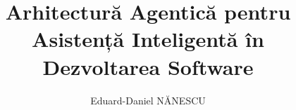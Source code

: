 \documentclass[12pt, a4paper, oneside, romanian]{teza-upb}
\begin{document}
\author{Eduard-Daniel NĂNESCU}
\title{Arhitectură Agentică pentru Asistență Inteligentă în Dezvoltarea Software}

\makeatletter

\renewcommand{\projectdescription} {

  \newpage
  \thispagestyle{empty}
  \small

  \noindent

  \begin{minipage}[t]{0.75\textwidth}
    Universitatea Națională de Știință și Tehnologie POLITEHNICA București\\
    Facultatea de Electronică, Telecomunicații și Tehnologia Informației\\
    Program de studiu \textbf{INF}
  \end{minipage}%

  \begin{minipage}[t]{0.25\textwidth}
    \raggedleft
    \textbf{}
  \end{minipage}

  \vspace{0.4cm}

  \begin{center}
    \textbf{TEMA PROIECTULUI DE DIPLOMĂ}\\
    a studentului \textbf{\@author, \@grupa}
  \end{center}

  \vspace{0.2cm}

  \noindent \textbf{1. Titlul temei:} \@title

  \vspace{0.2cm}

}
\end{document}
